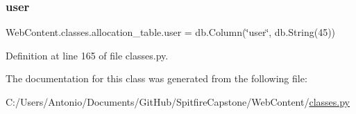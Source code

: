 \subsubsection{\texorpdfstring{user}{user}}
{\footnotesize\ttfamily Web\+Content.\+classes.\+allocation\+\_\+table.\+user = db.\+Column(\char`\"{}user\char`\"{}, db.\+String(45))\hspace{0.3cm}{\ttfamily [static]}}



Definition at line 165 of file classes.\+py.



The documentation for this class was generated from the following file\+:\begin{DoxyCompactItemize}
\item 
C\+:/\+Users/\+Antonio/\+Documents/\+Git\+Hub/\+Spitfire\+Capstone/\+Web\+Content/\hyperlink{classes_8py}{classes.\+py}\end{DoxyCompactItemize}
